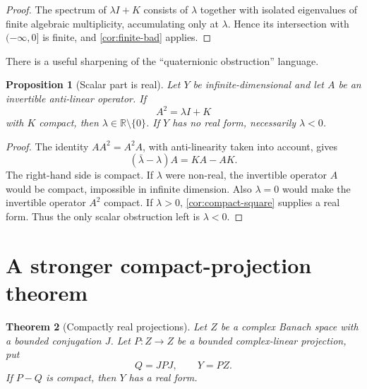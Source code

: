\documentclass[11pt]{article}
\newtheorem{theorem}{Theorem}[section]
\newtheorem{proposition}[theorem]{Proposition}
\theoremstyle{definition}
\theoremstyle{remark}
\newcommand{\R}{\mathbb R}
\begin{document}
\begin{proof}
The spectrum of $\lambda I+K$ consists of $\lambda$ together with isolated eigenvalues of finite algebraic multiplicity, accumulating only at $\lambda$. Hence its intersection with $(-\infty,0]$ is finite, and \cref{cor:finite-bad} applies.
\end{proof}

There is a useful sharpening of the ``quaternionic obstruction'' language.

\begin{proposition}[Scalar part is real]\label{prop:scalar-real}
Let $Y$ be infinite-dimensional and let $A$ be an invertible anti-linear operator. If
\[
 A^2=\lambda I+K
\]
with $K$ compact, then $\lambda\in\R\setminus\{0\}$. If $Y$ has no real form, necessarily $\lambda<0$.
\end{proposition}

\begin{proof}
The identity $AA^2=A^2A$, with anti-linearity taken into account, gives
\[
       (\bar\lambda-\lambda)A=KA-AK.
\]
The right-hand side is compact. If $\lambda$ were non-real, the invertible operator $A$ would be compact, impossible in infinite dimension. Also $\lambda=0$ would make the invertible operator $A^2$ compact. If $\lambda>0$, \cref{cor:compact-square} supplies a real form. Thus the only scalar obstruction left is $\lambda<0$.
\end{proof}

\section{A stronger compact-projection theorem}\label{sec:compact-projection}

\begin{theorem}[Compactly real projections]\label{thm:compactly-real-projection}
Let $Z$ be a complex Banach space with a bounded conjugation $J$. Let $P:Z\to Z$ be a bounded complex-linear projection, put
\[
       Q=JPJ,
       \qquad Y=PZ.
\]
If $P-Q$ is compact, then $Y$ has a real form.
\end{theorem}
\end{document}
